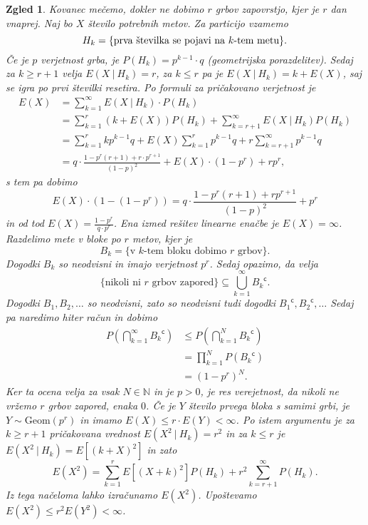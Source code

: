 \documentclass[10pt, a4paper]{article}
\newtheorem{zgled}[izr]{Zgled}
\newcommand{\stcomp}[1]{{#1}^{\mathsf{c}}}
\newcommand{\N}{\mathbb {N}}
\begin{document}
\begin{zgled}
  Kovanec mečemo, dokler ne dobimo $r$
  grbov zapovrstjo, kjer je $r$ dan vnaprej.
  Naj bo $X$ število potrebnih metov.
  Za particijo vzamemo 
  $$H_k = \{\textup{prva številka se pojavi na $k$-tem metu}\}.$$
  Če je $p$ verjetnost grba, je $P(H_k) = p^{k - 1} \cdot q$ (geometrijska porazdelitev).
  Sedaj za $k \geq r + 1$ velja $E(X\ |\ H_k) = r$, za $k \leq r$
  pa je $E(X\ |\ H_k) = k + E(X)$, saj se igra po prvi številki resetira.
  Po formuli za pričakovano verjetnost je 
  \begin{align*}
    E(X) &= \sum_{k = 1} ^\infty E(X\ |\ H_k) \cdot P(H_k)\\
    &= \sum_{k = 1} ^r (k + E(X)) P(H_k) + \sum_{k = r + 1} ^\infty E(X\ |\ H_k) P(H_k)\\
    &= \sum_{k = 1} ^r k p^{k - 1} q + E(X) \sum_{k = 1} ^r p^{k - 1} q + r \sum_{k = r + 1} ^\infty p^{k - 1} q\\
    &= q \cdot \frac{1 - p^{r} (r + 1) + r\cdot p^{r + 1}}{(1 - p)^2} + E(X) \cdot (1 - p^r) + rp^r,
  \end{align*} 
  s tem pa dobimo 
  $$E(X) \cdot (1 - (1 - p^r)) = q\cdot \frac{1 - p^r (r + 1) + rp^{r + 1}}{(1 -p)^2} + p^r$$
  in od tod $E(X) = \frac{1 - p^r}{q \cdot p^r}$.
  Ena izmed rešitev linearne enačbe je $E(X) = \infty$.
  Razdelimo mete v bloke po $r$ metov, kjer je 
  $$B_k = \{\text{v $k$-tem bloku dobimo $r$ grbov}\}.$$
  Dogodki $B_k$ so neodvisni in imajo verjetnost $p^r$.
  Sedaj opazimo, da velja 
  $$\{\text{nikoli ni $r$ grbov zapored}\} \subseteq \bigcup_{k = 1} ^\infty \stcomp{B_k}.$$
  Dogodki $B_1, B_2, \dots$ so neodvisni, zato so neodvisni tudi dogodki
  $\stcomp{B_1}, \stcomp{B_2}, \dots$ Sedaj pa naredimo hiter račun in dobimo 
  \begin{align*}
    P\left(\bigcap_{k = 1} ^\infty \stcomp{B_k}\right) &\leq P\left(\bigcap_{k = 1} ^N \stcomp{B_k}\right)\\
    &= \prod_{k = 1} ^N P\left(\stcomp{B_k}\right)\\
    &= (1 - p^r)^N.
  \end{align*}
  Ker ta ocena velja za vsak $N \in \N$ in je $p > 0$, je res verejetnost,
  da nikoli ne vržemo $r$ grbov zapored, enaka $0$.
  Če je $Y$ število prvega bloka s samimi grbi, je $Y \sim \mathrm{Geom} (p^r)$
  in imamo $E(X) \leq r \cdot E(Y) < \infty$.
  Po istem argumentu je za $k \geq r + 1$ pričakovana vrednost $E(X^2\ |\ H_k) = r^2$
  in za $k \leq r$ je $E(X^2\ |\ H_k) = E[(k + X)^2]$ in zato 
  $$E(X^2) = \sum_{k = 1} ^r E[(X + k)^2] P(H_k) + r^2 \sum_{k = r+ 1} ^\infty P(H_k).$$
  Iz tega načeloma lahko izračunamo $E(X^2)$.
  Upoštevamo $E(X^2) \leq r^2 E(Y^2) < \infty$.
\end{zgled}
\end{document}
